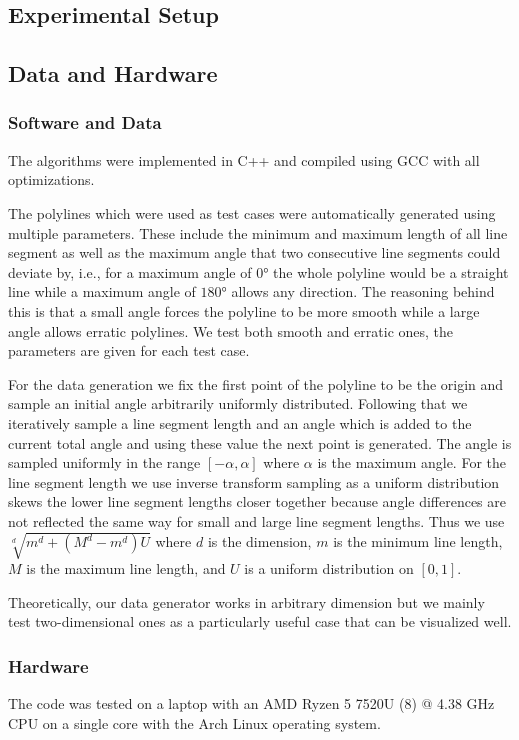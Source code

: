 \subsection{Experimental Setup}
\label{subsec:exp_setup}

\subsection{Data and Hardware}
\label{subsec:hardware}

\subsubsection{Software and Data}
\label{subsubsec:software}
The algorithms were implemented in C++ and compiled using GCC with all optimizations. 

The polylines which were used as test cases were automatically generated using multiple parameters. These include the minimum and maximum length of all line segment as well as the maximum angle that two consecutive line segments could deviate by, i.e., for a maximum angle of \(0\)° the whole polyline would be a straight line while a maximum angle of \(180\)° allows any direction. The reasoning behind this is that a small angle forces the polyline to be more smooth while a large angle allows erratic polylines. We test both smooth and erratic ones, the parameters are given for each test case. 

For the data generation we fix the first point of the polyline to be the origin and sample an initial angle arbitrarily uniformly distributed. Following that we iteratively sample a line segment length and an angle which is added to the current total angle and using these value the next point is generated. The angle is sampled uniformly in the range \([-\alpha, \alpha]\) where \(\alpha\) is the maximum angle. For the line segment length we use inverse transform sampling as a uniform distribution skews the lower line segment lengths closer together because angle differences are not reflected the same way for small and large line segment lengths. Thus we use \(\sqrt[d]{m^d + (M^d - m^d) U}\) where \(d\) is the dimension, \(m\) is the minimum line length, \(M\) is the maximum line length, and \(U\) is a uniform distribution on \([0,1]\).

Theoretically, our data generator works in arbitrary dimension but we mainly test two-dimensional ones as a particularly useful case that can be visualized well. 

\subsubsection{Hardware}
\label{subsubsec:hardware}
The code was tested on a laptop with an AMD Ryzen 5 7520U (8) @ 4.38 GHz CPU on a single core with the Arch Linux operating system.


